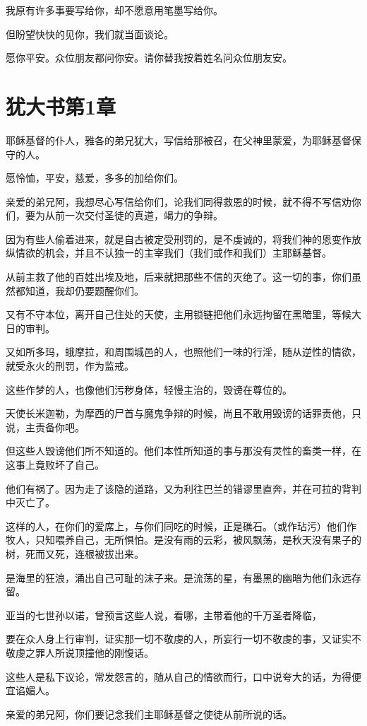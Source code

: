 \documentclass[12pt,oneside]{book}
\begin{document}
我原有许多事要写给你，却不愿意用笔墨写给你。

但盼望快快的见你，我们就当面谈论。

愿你平安。众位朋友都问你安。请你替我按着姓名问众位朋友安。

\chapter{犹大书第1章}
耶稣基督的仆人，雅各的弟兄犹大，写信给那被召，在父神里蒙爱，为耶稣基督保守的人。

愿怜恤，平安，慈爱，多多的加给你们。

亲爱的弟兄阿，我想尽心写信给你们，论我们同得救恩的时候，就不得不写信劝你们，要为从前一次交付圣徒的真道，竭力的争辩。

因为有些人偷着进来，就是自古被定受刑罚的，是不虔诚的，将我们神的恩变作放纵情欲的机会，并且不认独一的主宰我们（我们或作和我们）主耶稣基督。

从前主救了他的百姓出埃及地，后来就把那些不信的灭绝了。这一切的事，你们虽然都知道，我却仍要题醒你们。

又有不守本位，离开自己住处的天使，主用锁链把他们永远拘留在黑暗里，等候大日的审判。

又如所多玛，蛾摩拉，和周围城邑的人，也照他们一味的行淫，随从逆性的情欲，就受永火的刑罚，作为监戒。

这些作梦的人，也像他们污秽身体，轻慢主治的，毁谤在尊位的。

天使长米迦勒，为摩西的尸首与魔鬼争辩的时候，尚且不敢用毁谤的话罪责他，只说，主责备你吧。

但这些人毁谤他们所不知道的。他们本性所知道的事与那没有灵性的畜类一样，在这事上竟败坏了自己。

他们有祸了。因为走了该隐的道路，又为利往巴兰的错谬里直奔，并在可拉的背判中灭亡了。

这样的人，在你们的爱席上，与你们同吃的时候，正是礁石。（或作玷污）他们作牧人，只知喂养自己，无所惧怕。是没有雨的云彩，被风飘荡，是秋天没有果子的树，死而又死，连根被拔出来。

是海里的狂浪，涌出自己可耻的沫子来。是流荡的星，有墨黑的幽暗为他们永远存留。

亚当的七世孙以诺，曾预言这些人说，看哪，主带着他的千万圣者降临，

要在众人身上行审判，证实那一切不敬虔的人，所妄行一切不敬虔的事，又证实不敬虔之罪人所说顶撞他的刚愎话。

这些人是私下议论，常发怨言的，随从自己的情欲而行，口中说夸大的话，为得便宜谄媚人。

亲爱的弟兄阿，你们要记念我们主耶稣基督之使徒从前所说的话。
\end{document}
